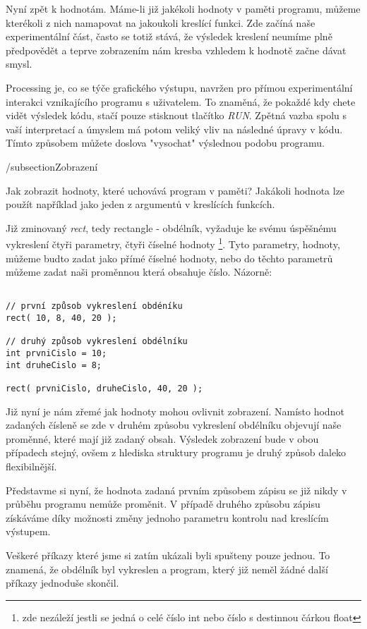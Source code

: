 \documentclass[11pt]{article} %
\begin{document}
Nyní zpět k hodnotám. Máme-li již jakékoli hodnoty v paměti programu, můžeme kterékoli z nich namapovat na jakoukoli kreslící funkci. Zde začíná naše experimentální část, často se totiž stává, že výsledek kreslení neumíme plně předpovědět a teprve zobrazením nám kresba vzhledem k hodnotě začne dávat smysl.

Processing je, co se týče grafického výstupu, navržen pro přímou experimentální interakci vznikajícího programu s uživatelem. To znaměná, že pokaždé kdy chete vidět výsledek kódu, stačí pouze stisknout tlačítko {\em RUN}. Zpětná vazba spolu s vaší interpretací a úmyslem má potom veliký vliv na následné úpravy v kódu. Tímto způsobem můžete doslova "vysochat" výslednou podobu programu.

/subsection{Zobrazení}

Jak zobrazit hodnoty, které uchovává program v paměti? Jakákoli hodnota lze použít například jako jeden z argumentů v kreslících funkcích.

Již zminovaný {\em rect}, tedy rectangle - obdélník, vyžaduje ke svému úspěšnému vykreslení čtyři parametry, čtyři číselné hodnoty \footnote{zde nezáleží jestli se jedná o celé číslo int nebo číslo s destinnou čárkou float}. Tyto parametry, hodnoty, můžeme budto zadat jako přímé číselné hodnoty, nebo do těchto parametrů můžeme zadat naši proměnnou která obsahuje číslo. Názorně:

\begin{verbatim}

// první způsob vykreslení obdéníku
rect( 10, 8, 40, 20 );

// druhý způsob vykreslení obdélníku
int prvniCislo = 10;
int druheCislo = 8;

rect( prvniCislo, druheCislo, 40, 20 );

\end{verbatim}


Již nyní je nám zřemé jak hodnoty mohou ovlivnit zobrazení. Namísto hodnot zadaných čísleně se zde v druhém způsobu vykreslení obdélníku objevují naše proměnné, které mají již zadaný obsah. Výsledek zobrazení bude v obou případech stejný, ovšem z hlediska struktury programu je druhý způsob daleko flexibilnější.

Představme si nyní, že hodnota zadaná prvním způsobem zápisu se již nikdy v průběhu programu nemůže proměnit. V případě druhého způsobu zápisu získáváme díky možnosti změny jednoho parametru kontrolu nad kreslícím výstupem.

Veškeré příkazy které jsme si zatím ukázali byli spušteny pouze jednou. To znamená, že obdélník byl vykreslen a program, který již neměl žádné další příkazy jednoduše skončil.
\end{document}
